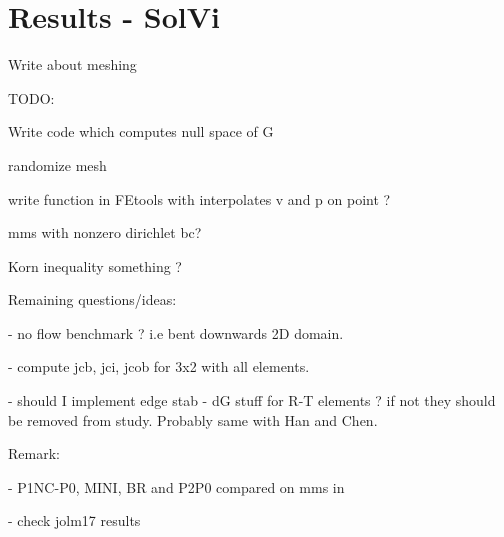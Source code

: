 \section*{Results - SolVi}

Write about meshing







\newpage
TODO:

Write code which computes null space of G 

randomize mesh

write function in FEtools with interpolates v and p on point ?

mms with nonzero dirichlet bc?

Korn inequality something ?



Remaining questions/ideas:

- no flow benchmark ? i.e bent downwards 2D domain. 

- compute jcb, jci, jcob for 3x2 with all elements.

- should I implement edge stab - dG stuff for R-T elements ? if not they should be  
removed from study. Probably same with Han and Chen.

Remark:

- P1NC-P0, MINI, BR and P2P0 compared on mms in \cite{cakp15}

- check jolm17 results

